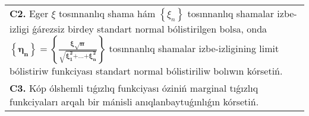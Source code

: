 \documentclass{article}
\begin{document}
\begin{tabular}{m{17cm}}
 \\
\textbf{C2.} 
Eger \(\xi\) tosınnanlıq shama hám \(\left\{ \xi_{n} \right\}\) tosınnanlıq shamalar izbe-izligi ǵárezsiz birdey standart normal bólistirilgen bolsa, onda \(\left\{ \mathbf{\eta}_{\mathbf{n}} \right\}\mathbf{=}\left\{ \frac{\mathbf{\xi}\sqrt{\mathbf{n}}}{\sqrt{\mathbf{\xi}_{\mathbf{1}}^{\mathbf{2}}\mathbf{+}\mathbf{...}\mathbf{+}\mathbf{\xi}_{\mathbf{n}}^{\mathbf{2}}}} \right\}\) tosınnanlıq shamalar izbe-izligining limit bólistiriw funkciyası standart normal bólistiriliw bolıwın kórsetiń.
 \\
\textbf{C3.} Kóp ólshemli tıǵızlıq funkciyası óziniń marginal tıǵızlıq funkciyaları arqalı bir mánisli anıqlanbaytuǵınlıǵın kórsetiń.
 \\

\end{tabular}
\vspace{1cm}
\end{document}
